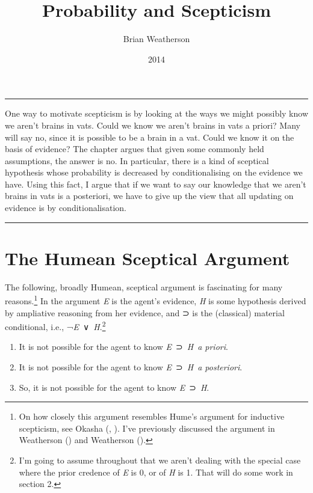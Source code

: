 \documentclass[
  10pt,
  letterpaper,
  DIV=11,
  numbers=noendperiod,
  twoside]{scrartcl}
\title{Probability and Scepticism}
\author{Brian Weatherson}
\date{2014}
\providecommand{\tightlist}{%
  \setlength{\itemsep}{0pt}\setlength{\parskip}{0pt}}\usepackage{longtable,booktabs,array}
\renewenvironment{abstract}
 {\vspace{-1.25cm}
 \quotation\small\noindent\rule{\linewidth}{.5pt}\par\smallskip
 \noindent }
 {\par\noindent\rule{\linewidth}{.5pt}\endquotation}
\begin{document}
\maketitle
\begin{abstract}
One way to motivate scepticism is by looking at the ways we might
possibly know we aren't brains in vats. Could we know we aren't brains
in vats a priori? Many will say no, since it is possible to be a brain
in a vat. Could we know it on the basis of evidence? The chapter argues
that given some commonly held assumptions, the answer is no. In
particular, there is a kind of sceptical hypothesis whose probability is
decreased by conditionalising on the evidence we have. Using this fact,
I argue that if we want to say our knowledge that we aren't brains in
vats is a posteriori, we have to give up the view that all updating on
evidence is by conditionalisation.
\end{abstract}

\section{The Humean Sceptical
Argument}\label{the-humean-sceptical-argument}

The following, broadly Humean, sceptical argument is fascinating for
many reasons.\footnote{On how closely this argument resembles Hume's
  argument for inductive scepticism, see Okasha
  (, ).
  I've previously discussed the argument in Weatherson
  () and Weatherson
  ().} In the argument \emph{E} is
the agent's evidence, \emph{H} is some hypothesis derived by ampliative
reasoning from her evidence, and ⊃ is the (classical) material
conditional, i.e., ¬\emph{E}~∨~\emph{H}.\footnote{I'm going to assume
  throughout that we aren't dealing with the special case where the
  prior credence of \emph{E} is 0, or of \emph{H} is 1. That will do
  some work in section 2.}

\begin{enumerate}
\def\labelenumi{\arabic{enumi}.}
\tightlist
\item
  It is not possible for the agent to know \emph{E}~⊃~\emph{H}~\emph{a
  priori}.
\item
  It is not possible for the agent to know \emph{E}~⊃~\emph{H}~\emph{a
  posteriori}.
\item
  So, it is not possible for the agent to know \emph{E}~⊃~\emph{H}.
\end{enumerate}
\end{document}
